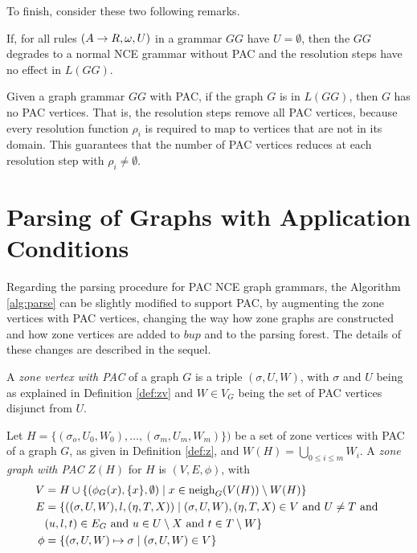 To finish, consider these two following remarks.

\begin{remark}
	If, for all rules $(A \to R,\omega,U)$ in a grammar $GG$ have $U = \emptyset$, then the $GG$ degrades to a normal NCE grammar without PAC and the resolution steps have no effect in $L(GG)$.
\end{remark}

\begin{remark}
	Given a graph grammar $GG$ with PAC, if the graph $G$ is in $L(GG)$, then $G$ has no PAC vertices. That is, the resolution steps remove all PAC vertices, because every resolution function $\rho_i$ is required to map to vertices that are not in its domain. This guarantees that the number of PAC vertices reduces at each resolution step with $\rho_i \neq \emptyset$.
\end{remark}

\section{Parsing of Graphs with Application Conditions}
\label{sec:pac-parsing}
Regarding the parsing procedure for PAC NCE graph grammars, the Algorithm \ref{alg:parse} can be slightly modified to support PAC, by augmenting the zone vertices with PAC vertices, changing the way how zone graphs are constructed and how zone vertices are added to $bup$ and to the parsing forest. The details of these changes are described in the sequel.

\begin{definition}
	A \emph{zone vertex with PAC} of a graph $G$ is a triple $(\sigma, U, W)$, with $\sigma$ and $U$ being as explained in Definition \ref{def:zv} and $W \in V_G$ being the set of PAC vertices disjunct from $U$.
\end{definition}

\begin{definition}
	Let $H = \{(\sigma_o,U_0,W_0), \dots, (\sigma_m, U_m, W_m)\})$ be a set of zone vertices with PAC of a graph $G$, as given in Definition \ref{def:z}, and $W(H) = \bigcup_{0 \le i \le m}{W_i}$. A \emph{zone graph with PAC} $Z(H)$ for $H$ is $(V,E,\phi)$, with
	\begin{align*}
		V & = H \cup \{(\phi_G(x),\{x\}, \emptyset) \; | \; x \in \operatorname{neigh}_{G}(V(H)) \setminus W(H) \} \\
		E & = \{((\sigma,U,W),l,(\eta,T,X)) \; | \; (\sigma,U,W),(\eta,T,X) \in V \text{ and } U \neq T \text{ and } \\
		& (u,l,t) \in E_G \text{ and } u \in U \setminus X \text{ and } t \in T \setminus W \} \\
		\phi & = \{(\sigma,U,W) \mapsto \sigma \; | \; (\sigma,U,W) \in V\}
	\end{align*}
\end{definition}

